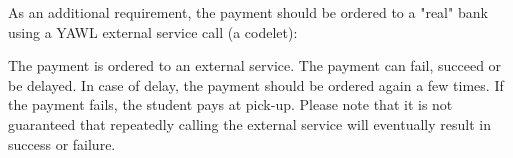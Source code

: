 As an additional requirement, the payment should be ordered to a "real" bank
using a YAWL external service call (a codelet):

The payment is ordered to an external service. The payment can fail, succeed
or be delayed. In case of delay, the payment should be ordered again a few times.
If the payment fails, the student pays at pick-up. Please note that it is not
guaranteed that repeatedly calling the external service will eventually result in
success or failure.

\clearpage
